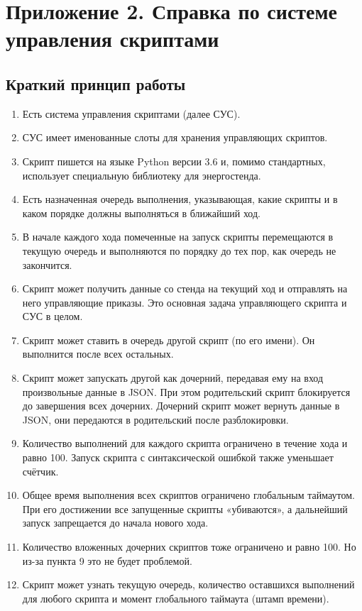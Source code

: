 \section*{Приложение 2. Справка по системе управления скриптами}

\subsection*{Краткий принцип работы}

\begin{enumerate}
    \item Есть система управления скриптами (далее СУС). 
    \item СУС имеет именованные слоты для хранения управляющих скриптов. 
    \item Скрипт пишется на языке Python версии 3.6 и, помимо стандартных, использует специальную библиотеку для энергостенда. 
    \item Есть назначенная очередь выполнения, указывающая, какие скрипты и в каком порядке должны выполняться в ближайший ход. 
    \item В начале каждого хода помеченные на запуск скрипты перемещаются в текущую очередь и выполняются по порядку до тех пор, как очередь не закончится. 
    \item Скрипт может получить данные со стенда на текущий ход и отправлять на него управляющие приказы. Это основная задача управляющего скрипта и СУС в целом. 
    \item Скрипт может ставить в очередь другой скрипт (по его имени). Он выполнится после всех остальных. 
    \item Скрипт может запускать другой как дочерний, передавая ему на вход произвольные данные в JSON. При этом родительский скрипт блокируется до завершения всех дочерних. Дочерний скрипт может вернуть данные в JSON, они передаются в родительский после разблокировки. 
    \item Количество выполнений для каждого скрипта ограничено в течение хода и равно 100. Запуск скрипта с синтаксической ошибкой также уменьшает счётчик. 
    \item Общее время выполнения всех скриптов ограничено глобальным таймаутом. При его достижении все запущенные скрипты «убиваются», а дальнейший запуск запрещается до начала нового хода. 
    \item Количество вложенных дочерних скриптов тоже ограничено и равно 100. Но из-за пункта 9 это не будет проблемой. 
    \item Скрипт может узнать текущую очередь, количество оставшихся выполнений для любого скрипта и момент глобального таймаута (штамп времени). 
\end{enumerate}

